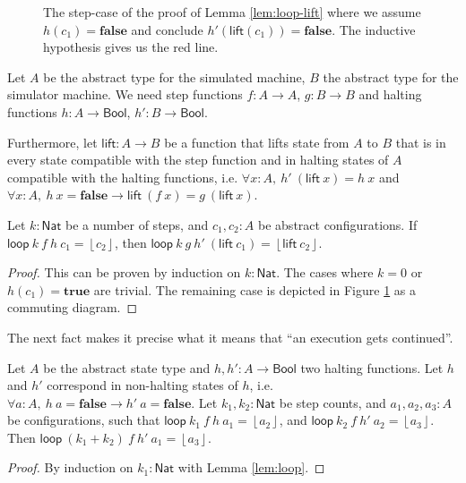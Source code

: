 \documentclass{psartcl}
\newcommand{\MS}[1]{\textsf{#1}}
\newcommand{\from}{:}
\renewcommand{\to}{\rightarrow}
\newcommand{\Bool}{\MS{Bool}}
\newcommand{\Nat}{\MS{Nat}}
\newcommand{\Some}[1]{\left\lfloor #1\right\rfloor}
\newcommand{\true}{\mathbf{true}}
\newcommand{\false}{\mathbf{false}}
\begin{document}
\begin{figure}
  \center
  \caption{The step-case of the proof of Lemma \ref{lem:loop-lift} where we assume $h(c_1) = \false$ and conclude $h'(\MS{lift}(c_1)) = \false$.
  The inductive hypothesis gives us the red line.}
  \label{fig:proof-loop-lift}
\end{figure}
\begin{lemma}[Lift $\MS{loop}$]
  \label{lem:loop-lift}
  Let $A$ be the abstract type for the simulated machine, $B$ the abstract type for the simulator machine.
  We need step functions $f \from A \to A$, $g \from B \to B$ and halting functions $h \from A \to \Bool$, $h' \from B \to \Bool$.

  Furthermore, let $\MS{lift} \from A \to B$ be a function that lifts state from $A$ to $B$ that is in every state compatible with the step function and
  in halting states of $A$ compatible with the halting functions, i.e.
  $\forall x:A,~h'~(\MS{lift}~x) = h~x$ and $\forall x:A,~h~x = \false \rightarrow \MS{lift}~(f~x) = g~(\MS{lift}~x)$.

  Let $k:\Nat$ be a number of steps, and $c_1, c_2:A$ be abstract configurations.
  If $\MS{loop}~k~f~h~c_1 = \Some{c_2}$, then $\MS{loop}~k~g~h'~(\MS{lift}~c_1) = \Some{\MS{lift}~c_2}$.
\end{lemma}
\begin{proof}
  This can be proven by induction on $k:\Nat$.  The cases where $k=0$ or $h(c_1) = \true$ are trivial.
  The remaining case is depicted in Figure \ref{fig:proof-loop-lift} as a commuting diagram.
\end{proof}

The next fact makes it precise what it means that ``an execution gets continued''.

\begin{lemma}
  \label{lem:loop-merge}
  Let $A$ be the abstract state type and $h, h' \from A \to \Bool$ two halting functions.
  Let $h$ and $h'$ correspond in non-halting states of $h$, i.e.  $\forall a:A,~h~a = \false \rightarrow h'~a = \false$.
  Let $k_1, k_2:\Nat$ be step counts, and $a_1, a_2, a_3:A$ be configurations, such that
  $\MS{loop}~k_1~f~h~a_1 = \Some{a_2}$, and $\MS{loop}~k_2~f~h'~a_2 = \Some{a_3}$.
  Then $\MS{loop}~(k_1 + k_2)~f~h'~a_1 = \Some{a_3}$.
\end{lemma}
\begin{proof}
  By induction on $k_1:\Nat$ with Lemma \ref{lem:loop}.
\end{proof}
\end{document}
